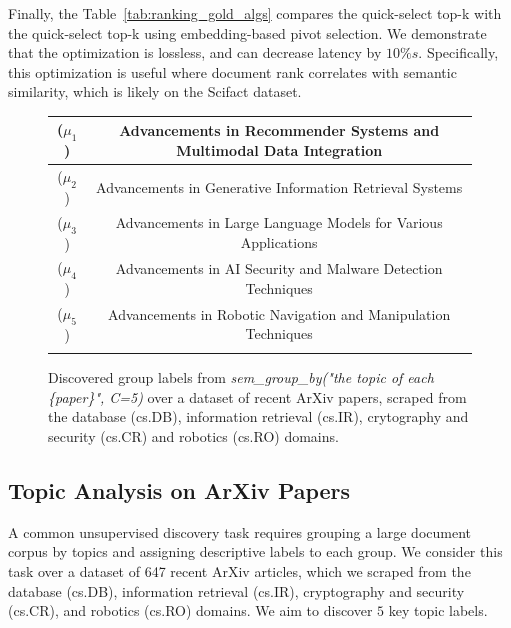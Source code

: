 Finally, the Table~\ref{tab:ranking_gold_algs} compares the quick-select top-k with the \sys quick-select top-k using embedding-based pivot selection. We demonstrate that the optimization is lossless, and can decrease latency by $10\%s$. Specifically, this optimization is useful where document rank correlates with semantic similarity, which is likely on the Scifact dataset.

\begin{figure}[t]
  \centering
  \vspace{-.1cm}
    \centering
    \begin{footnotesize}
        \begin{tabular}{cc}
        \toprule
        ($\mu_1$) & Advancements in Recommender Systems and Multimodal Data Integration\\
        \hline
        ($\mu_2$) &Advancements in Generative Information Retrieval Systems\\                \hline

        ($\mu_3$) & Advancements in Large Language Models for Various Applications\\                \hline

        ($\mu_4$) & Advancements in AI Security and Malware Detection Techniques\\
        \hline

        ($\mu_5$) & Advancements in Robotic Navigation and Manipulation Techniques\\
        \bottomrule
        \label{tab:groupby}
        \end{tabular}
    \end{footnotesize}
    \vspace{-.5cm}
    \label{}
  \vspace{-.2cm}
  \caption{\small Discovered group labels from \sys \textit{sem\_group\_by("the topic of each \{paper\}", C=5)} over a dataset of recent ArXiv papers, scraped from the database (cs.DB), information retrieval (cs.IR), crytography and security (cs.CR) and robotics (cs.RO) domains.} 
  \label{fig:groupby_labels}
\vspace{-.5cm}
\end{figure}

\subsection{Topic Analysis on ArXiv Papers}
\label{subsec:arxiv_papers}
A common unsupervised discovery task requires grouping a large document corpus by topics and assigning descriptive labels to each group.
We consider this task over a dataset of 647 recent ArXiv articles, which we scraped from the database (cs.DB), information retrieval (cs.IR), cryptography and security (cs.CR), and robotics (cs.RO) domains. We aim to discover $5$ key topic labels.

